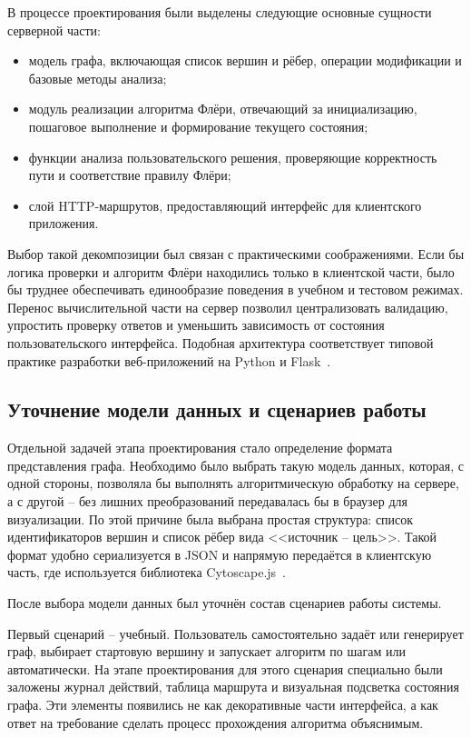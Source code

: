 \documentclass[a4paper,12pt]{extarticle}
\begin{document}
В процессе проектирования были выделены следующие основные сущности серверной части:
\begin{itemize}
  \item модель графа, включающая список вершин и рёбер, операции модификации и базовые методы анализа;
  \item модуль реализации алгоритма Флёри, отвечающий за инициализацию, пошаговое выполнение и формирование текущего состояния;
  \item функции анализа пользовательского решения, проверяющие корректность пути и соответствие правилу Флёри;
  \item слой HTTP-маршрутов, предоставляющий интерфейс для клиентского приложения.
\end{itemize}

Выбор такой декомпозиции был связан с практическими соображениями. Если бы логика проверки и алгоритм Флёри находились только в клиентской части, было бы труднее обеспечивать единообразие поведения в учебном и тестовом режимах. Перенос вычислительной части на сервер позволил централизовать валидацию, упростить проверку ответов и уменьшить зависимость от состояния пользовательского интерфейса. Подобная архитектура соответствует типовой практике разработки веб-приложений на Python и Flask~\cite{python3docs,flaskdocs}.

\subsection{Уточнение модели данных и сценариев работы}

Отдельной задачей этапа проектирования стало определение формата представления графа. Необходимо было выбрать такую модель данных, которая, с одной стороны, позволяла бы выполнять алгоритмическую обработку на сервере, а с другой -- без лишних преобразований передавалась бы в браузер для визуализации. По этой причине была выбрана простая структура: список идентификаторов вершин и список рёбер вида <<источник -- цель>>. Такой формат удобно сериализуется в JSON и напрямую передаётся в клиентскую часть, где используется библиотека Cytoscape.js~\cite{cytoscapejs}.

После выбора модели данных был уточнён состав сценариев работы системы.

Первый сценарий -- учебный. Пользователь самостоятельно задаёт или генерирует граф, выбирает стартовую вершину и запускает алгоритм по шагам или автоматически. На этапе проектирования для этого сценария специально были заложены журнал действий, таблица маршрута и визуальная подсветка состояния графа. Эти элементы появились не как декоративные части интерфейса, а как ответ на требование сделать процесс прохождения алгоритма объяснимым.
\end{document}
